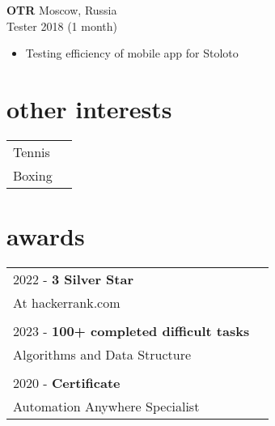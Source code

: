 \documentclass[12pt]{article}
\newcommand{\entry}[4]{{{\textbf{#1}}} \hfill #3 \\ #2 \hfill #4}
\begin{document}
\begin{paracol}{2}
\entry{OTR}{Tester}{Moscow, Russia}{2018 (1 month)}
\begin{itemize}[noitemsep,leftmargin=3.5mm,rightmargin=0mm,topsep=6pt]
  \item Testing efficiency of mobile app for Stoloto
\end{itemize}


\switchcolumn

\section{other interests}
\begin{supertabular}{ll}
  {Tennis}\\
  {Boxing}\\
\end{supertabular}

\bigskip

\section{awards}
\begin{supertabular}{ll}
  2022 - \textbf{3 Silver Star} \\
  {}{At hackerrank.com}\\\\
  2023 - \textbf{100+ completed difficult tasks}\\
  {}{Algorithms and Data Structure}\\\\
  2020 - \textbf{Certificate}\\
  {}{Automation Anywhere Specialist}\\
\end{supertabular}

\end{paracol}

\vspace*{\fill}
\end{document}
